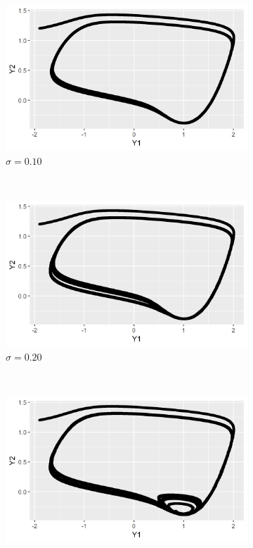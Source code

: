 \documentclass[a4paper]{article}
\begin{document}
\begin{figure}[ht!]
    \centering
    \begin{subfigure}[b]{0.45\textwidth}
        \includegraphics[width=\textwidth]{part1a-sigma1-Y1Y2.png}
        \caption{$\sigma = 0.10$}
    \end{subfigure}
    ~
    \begin{subfigure}[b]{0.45\textwidth}
        \includegraphics[width=\textwidth]{part1a-sigma2-Y1Y2.png}
        \caption{$\sigma = 0.20$}
    \end{subfigure}
    ~
    \begin{subfigure}[b]{0.45\textwidth}
        \includegraphics[width=\textwidth]{part1a-sigma3-Y1Y2.png}

\end{subfigure}
\end{figure}
\end{document}
